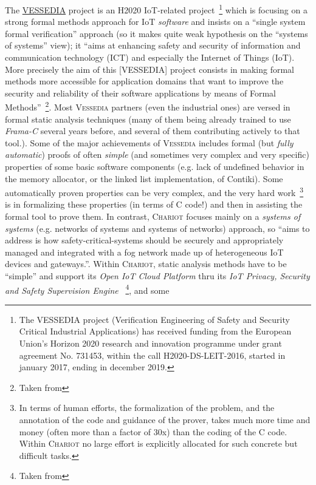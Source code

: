 The \href{http://vessedia.eu/}{VESSEDIA} project is an H2020
IoT-related project~\footnote{The VESSEDIA project (Verification
  Engineering of Safety and Security Critical Industrial Applications)
  has received funding from the European Union's Horizon 2020 research
  and innovation programme under grant agreement No. 731453, within
  the call H2020-DS-LEIT-2016, started in january 2017, ending in
  december 2019.} which is focusing on a strong formal methods
approach for IoT \emph{software} and insists on a ``single system
formal verification'' approach (so it makes quite weak hypothesis on
the ``systems of systems'' view); it ``aims at enhancing safety and
security of information and communication technology (ICT) and
especially the Internet of Things (IoT). More precisely the aim of
this [VESSEDIA] project consists in making formal methods more
accessible for application domains that want to improve the security
and reliability of their software applications by means of Formal
Methods''~\footnote{Taken from
  }. Most \textsc{Vessedia} partners
(even the industrial ones) are versed in formal static analysis
techniques (many of them being already trained to use \emph{Frama-C}
several years before, and several of them contributing actively to
that tool.). Some of the major achievements of \textsc{Vessedia}
includes formal (but \emph{fully automatic}) proofs of often
\emph{simple} (and sometimes very complex and very specific)
properties of some basic software components (e.g. lack of undefined
behavior in the memory allocator, or the linked list implementation,
of Contiki). Some automatically proven properties can be very complex,
and the very hard work~\footnote{In terms of human efforts, the
  formalization of the problem, and the annotation of the code and
  guidance of the prover, takes much more time and money (often more
  than a factor of 30x) than the coding of the C code. Within
  \textsc{Chariot} no large effort is explicitly allocated for such
  concrete but difficult tasks.}  is in formalizing these properties
(in terms of C code!)  and then in assisting the formal tool to prove
them. In contrast, \textsc{Chariot} focuses mainly on a \emph{systems
  of systems} (e.g. networks of systems and systems of networks)
approach, so ``aims to address is how safety-critical-systems should
be securely and appropriately managed and integrated with a fog
network made up of heterogeneous IoT devices and gateways.''. Within
\textsc{Chariot}, static analysis methods have to be ``simple'' and
support its \emph{Open IoT Cloud Platform} thru its \emph{IoT Privacy,
  Security and Safety Supervision Engine} ~\footnote{Taken
  from }, and some

